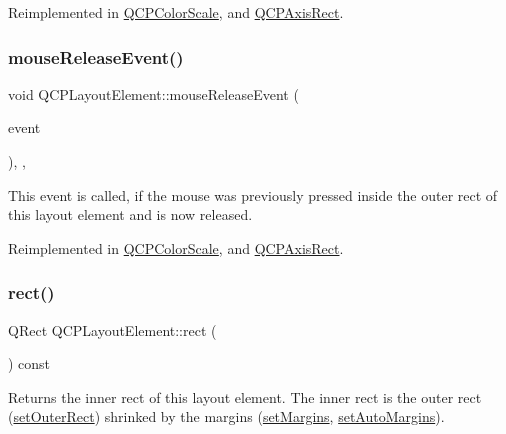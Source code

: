 Reimplemented in \mbox{\hyperlink{class_q_c_p_color_scale_a5df6ad81b2ad045878d276c2d5be7120}{Q\+C\+P\+Color\+Scale}}, and \mbox{\hyperlink{class_q_c_p_axis_rect_a77501dbeccdac7256f7979b05077c04e}{Q\+C\+P\+Axis\+Rect}}.

\mbox{\label{class_q_c_p_layout_element_ae526ac828cce1e5bb94eaa85776d7404}} 
\subsubsection{\texorpdfstring{mouse\+Release\+Event()}{mouseReleaseEvent()}}
{\footnotesize\ttfamily void Q\+C\+P\+Layout\+Element\+::mouse\+Release\+Event (\begin{DoxyParamCaption}\item[{Q\+Mouse\+Event $\ast$}]{event }\end{DoxyParamCaption})\hspace{0.3cm}{\ttfamily [inline]}, {\ttfamily [protected]}, {\ttfamily [virtual]}}

This event is called, if the mouse was previously pressed inside the outer rect of this layout element and is now released. 

Reimplemented in \mbox{\hyperlink{class_q_c_p_color_scale_a0916613d20901950fc6d00c6f99fe0a1}{Q\+C\+P\+Color\+Scale}}, and \mbox{\hyperlink{class_q_c_p_axis_rect_adf6c99780cea55ab39459a6eaad3a94a}{Q\+C\+P\+Axis\+Rect}}.

\mbox{\label{class_q_c_p_layout_element_a208effccfe2cca4a0eaf9393e60f2dd4}} 
\subsubsection{\texorpdfstring{rect()}{rect()}}
{\footnotesize\ttfamily Q\+Rect Q\+C\+P\+Layout\+Element\+::rect (\begin{DoxyParamCaption}{ }\end{DoxyParamCaption}) const\hspace{0.3cm}{\ttfamily [inline]}}

Returns the inner rect of this layout element. The inner rect is the outer rect (\mbox{\hyperlink{class_q_c_p_layout_element_a38975ea13e36de8e53391ce41d94bc0f}{set\+Outer\+Rect}}) shrinked by the margins (\mbox{\hyperlink{class_q_c_p_layout_element_a8f450b1f3f992ad576fce2c63d8b79cf}{set\+Margins}}, \mbox{\hyperlink{class_q_c_p_layout_element_accfda49994e3e6d51ed14504abf9d27d}{set\+Auto\+Margins}}).

